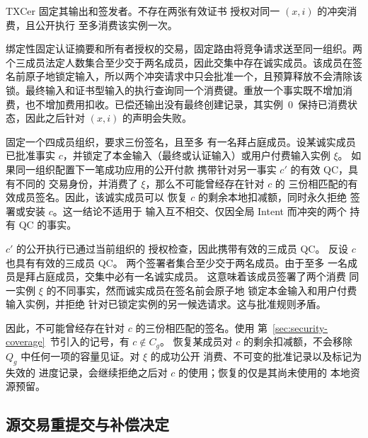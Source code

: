 \begin{lemma}[经过认证的唯一消费]
\label{lem:security-consumption}
TXCer 固定其输出和签发者。不存在两张有效证书
授权对同一 $(x,i)$ 的冲突消费，且公开执行
至多消费该实例一次。
\end{lemma}
\begin{IEEEproof}
绑定性固定认证摘要和所有者授权的交易，固定路由将竞争请求送至同一组织。两个三成员法定人数集合至少交于两名成员，因此交集中存在诚实成员。该成员在签名前原子地锁定输入，所以两个冲突请求中只会批准一个，且预算释放不会清除该锁。最终输入和证书型输入的执行查询同一个消费键。重放一个事实既不增加消费，也不增加费用扣收。已偿还输出没有最终创建记录，其实例~0~保持已消费状态，因此之后针对 $(x,i)$ 的声明会失败。
\end{IEEEproof}

\begin{lemma}[被取代的部分批准]
\label{lem:security-superseded}
固定一个四成员组织，要求三份签名，且至多
有一名拜占庭成员。设某诚实成员已批准事实
$c$，并锁定了本金输入（最终或认证输入）或用户付费输入实例 $\xi$。
如果同一组织配置下一笔成功应用的公开付款
携带针对另一事实 $c'$ 的有效 QC，具有不同的
交易身份，并消费了 $\xi$，那么不可能曾经存在针对 $c$ 的
三份相匹配的有效成员签名。因此，该诚实成员可以
恢复 $c$ 的剩余本地扣减额，同时永久拒绝
签署或安装 $c$。这一结论不适用于
输入互不相交、仅因全局 Intent 而冲突的两个
持有 QC 的事实。
\end{lemma}

\begin{IEEEproof}
$c'$ 的公开执行已通过当前组织的
授权检查，因此携带有效的三成员 QC。
反设 $c$ 也具有有效的三成员 QC。
两个签署者集合至少交于两名成员。由于至多
一名成员是拜占庭成员，交集中必有一名诚实成员。
这意味着该成员签署了两个消费
同一实例 $\xi$ 的不同事实，然而诚实成员在签名前会原子地
锁定本金输入和用户付费输入实例，并拒绝
针对已锁定实例的另一候选请求。这与批准规则矛盾。

因此，不可能曾经存在针对 $c$ 的三份相匹配的签名。使用
第~\ref{sec:security-coverage}~节引入的记号，有 $c\notin C_g$。
恢复某成员对 $c$ 的剩余扣减额，不会移除
$Q_g$ 中任何一项的容量见证。对 $\xi$ 的成功公开
消费、不可变的批准记录以及标记为失效的
进度记录，会继续拒绝之后对 $c$ 的使用；恢复的仅是其尚未使用的
本地资源预留。
\end{IEEEproof}

\subsection{源交易重提交与补偿决定}
\label{sec:security-decision}

